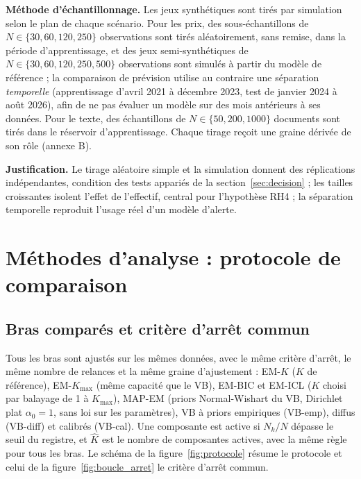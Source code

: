 \textbf{Méthode d'échantillonnage. }Les jeux synthétiques sont tirés par simulation selon le plan de chaque scénario. Pour les prix, des sous-échantillons de $N \in \{30, 60, 120, 250\}$ observations sont tirés aléatoirement, sans remise, dans la période d'apprentissage, et des jeux semi-synthétiques de $N \in \{30, 60, 120, 250, 500\}$ observations sont simulés à partir du modèle de référence ; la comparaison de prévision utilise au contraire une séparation \emph{temporelle} (apprentissage d'avril 2021 à décembre 2023, test de janvier 2024 à août 2026), afin de ne pas évaluer un modèle sur des mois antérieurs à ses données. Pour le texte, des échantillons de $N \in \{50, 200, 1000\}$ documents sont tirés dans le réservoir d'apprentissage. Chaque tirage reçoit une graine dérivée de son rôle (annexe B).

\textbf{Justification. }Le tirage aléatoire simple et la simulation donnent des réplications indépendantes, condition des tests appariés de la section~\ref{sec:decision} ; les tailles croissantes isolent l'effet de l'effectif, central pour l'hypothèse RH4 ; la séparation temporelle reproduit l'usage réel d'un modèle d'alerte.

\section{Méthodes d'analyse : protocole de comparaison}\label{sec:protocole}
\subsection{Bras comparés et critère d'arrêt commun}\label{sec:bras_compares_et_critere_d}
Tous les bras sont ajustés sur les mêmes données, avec le même critère d'arrêt, le même nombre de relances et la même graine d'ajustement : EM-$K$ ($K$ de référence), EM-$K_{\max}$ (même capacité que le VB), EM-BIC et EM-ICL ($K$ choisi par balayage de 1 à $K_{\max}$), MAP-EM (priors Normal-Wishart du VB, Dirichlet plat $\alpha_0 = 1$, sans loi sur les paramètres), VB à priors empiriques (VB-emp), diffus (VB-diff) et calibrés (VB-cal). Une composante est active si $N_k/N$ dépasse le seuil du registre, et $\hat K$ est le nombre de composantes actives, avec la même règle pour tous les bras. Le schéma de la figure~\ref{fig:protocole} résume le protocole et celui de la figure~\ref{fig:boucle_arret} le critère d'arrêt commun.



